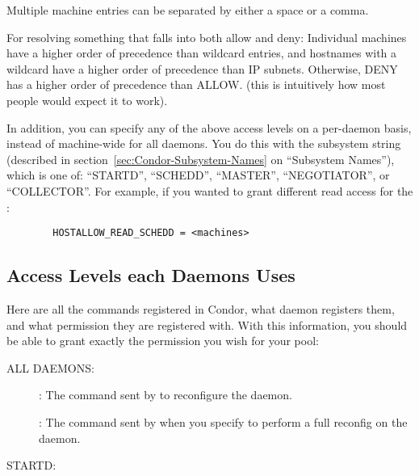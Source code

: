 Multiple machine entries can be separated by either a space or a comma.

For resolving something that falls into both allow and deny: Individual
machines have a higher order of precedence than wildcard entries, and
hostnames with a wildcard have a higher order of precedence than IP
subnets.  Otherwise, DENY has a higher order of precedence than ALLOW.
(this is intuitively how most people would expect it to work).  

In addition, you can specify any of the above access levels on a
per-daemon basis, instead of machine-wide for all daemons.  You do
this with the subsystem string (described in
section~\ref{sec:Condor-Subsystem-Names} on ``Subsystem Names''),
which is one of: ``STARTD'', ``SCHEDD'', ``MASTER'', ``NEGOTIATOR'',
or ``COLLECTOR''.  For example, if you wanted to grant different read
access for the :
\begin{verbatim}
        HOSTALLOW_READ_SCHEDD = <machines>
\end{verbatim}

\subsection{\label{sec:DCPerm-per-Daemon}Access Levels each Daemons
Uses} 

Here are all the commands registered in Condor, what daemon registers
them, and what permission they are registered with.  With this
information, you should be able to grant exactly the permission you
wish for your pool:

ALL DAEMONS:

\begin{description}
\item[] : The command sent by  to
  reconfigure the daemon.

\item[] : The command sent by 
when you specify  to perform a full reconfig on the
daemon. 
\end{description}

STARTD:

